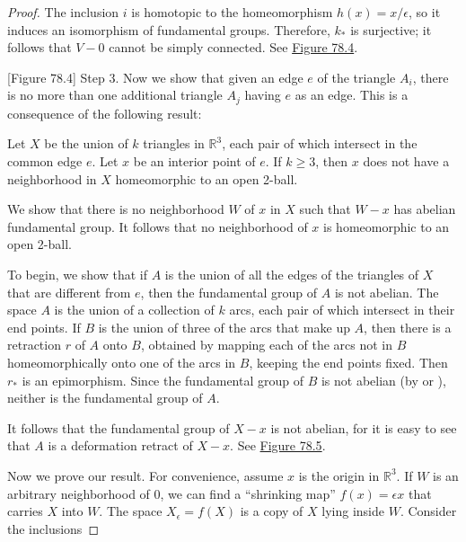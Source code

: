 \begin{proof}
The inclusion \(i\) is homotopic to the homeomorphism \(h(x) = x/\epsilon\), so it induces an isomorphism of fundamental groups. Therefore, \(k_{ * }\) is surjective; it follows that \(V - 0\) cannot be simply connected. See \hyperref[fig:78.4]{Figure 78.4}.

[Figure 78.4]
Step 3. Now we show that given an edge \(e\) of the triangle \(A_{i}\), there is no more than one additional triangle \(A_{j}\) having \(e\) as an edge. This is a consequence of the following result:

Let \(X\) be the union of \(k\) triangles in \(\mathbb{R}^{3}\), each pair of which intersect in the common edge \(e\). Let \(x\) be an interior point of \(e\). If \(k \geq 3\), then \(x\) does not have a neighborhood in \(X\) homeomorphic to an open 2-ball.

We show that there is no neighborhood \(W\) of \(x\) in \(X\) such that \(W - x\) has abelian fundamental group. It follows that no neighborhood of \(x\) is homeomorphic to an open 2-ball.

To begin, we show that if \(A\) is the union of all the edges of the triangles of \(X\) that are different from \(e\), then the fundamental group of \(A\) is not abelian. The space \(A\) is the union of a collection of \(k\) arcs, each pair of which intersect in their end points. If \(B\) is the union of three of the arcs that make up \(A\), then there is a retraction \(r\) of \(A\) onto \(B\), obtained by mapping each of the arcs not in \(B\) homeomorphically onto one of the arcs in \(B\), keeping the end points fixed. Then \(r_{ * }\) is an epimorphism. Since the fundamental group of \(B\) is not abelian (by  or ), neither is the fundamental group of \(A\).

It follows that the fundamental group of \(X - x\) is not abelian, for it is easy to see that \(A\) is a deformation retract of \(X - x\). See \hyperref[fig:78.5]{Figure 78.5}.

Now we prove our result. For convenience, assume \(x\) is the origin in \(\mathbb{R}^{3}\). If \(W\) is an arbitrary neighborhood of 0, we can find a ``shrinking map'' \(f(x) = {\epsilon x}\) that carries \(X\) into \(W\). The space \(X_{\epsilon } = f( X)\) is a copy of \(X\) lying inside \(W\). Consider the inclusions


\end{proof}
